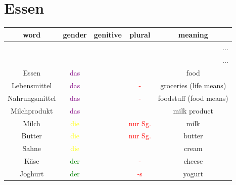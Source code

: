 \section{Essen}
\begin{center}
    \begin{longtable} {|c|c|c|c|c|}
        \hline
        \rowcolor{gray}
        word                  & gender                  & genitive & plural                                  & meaning                \\
        \hline
        \endfirsthead
        \multicolumn{5}{r}{...}                                                                                                       \\
        \hline
        \endhead
        \hline
        \multicolumn{5}{r}{...}                                                                                                       \\
        \endfoot
        \hline
        \endlastfoot
        \hline
        Essen                 & \textcolor{purple}{das} &          &                                         & food                   \\
        Lebensmittel          & \textcolor{purple}{das} &          & \textcolor{red}{-}                      & groceries (life means) \\
        Nahrungsmittel        & \textcolor{purple}{das} &          & \textcolor{red}{-}                      & foodstuff (food means) \\
        \hline
        Milchprodukt          & \textcolor{purple}{das} &          &                                         & milk product           \\
        Milch                 & \textcolor{yellow}{die} &          & \textcolor{red}{nur Sg.}                & milk                   \\
        Butter                & \textcolor{yellow}{die} &          & \textcolor{red}{nur Sg.}                & butter                 \\
        Sahne                 & \textcolor{yellow}{die} &          &                                         & cream                  \\
        Käse                  & \textcolor{green}{der}  &          & \textcolor{red}{-}                      & cheese                 \\
        Joghurt               & \textcolor{green}{der}  &          & \textcolor{red}{-s}                     & yogurt                 \\

\end{longtable}
\end{center}
